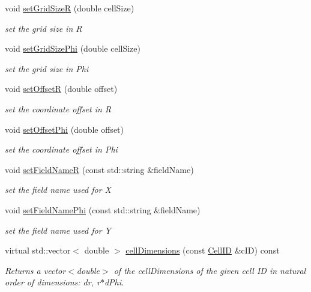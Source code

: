 \begin{DoxyCompactItemize}
void \hyperlink{class_d_d4hep_1_1_d_d_segmentation_1_1_polar_grid_r_phi_ab757b018648dc4207f94ab1d13d990ef}{set\+Grid\+SizeR} (double cell\+Size)
\begin{DoxyCompactList}\small\item\em set the grid size in R \end{DoxyCompactList}\item 
void \hyperlink{class_d_d4hep_1_1_d_d_segmentation_1_1_polar_grid_r_phi_af50d9792d10242bbc70cbd07709bc82b}{set\+Grid\+Size\+Phi} (double cell\+Size)
\begin{DoxyCompactList}\small\item\em set the grid size in Phi \end{DoxyCompactList}\item 
void \hyperlink{class_d_d4hep_1_1_d_d_segmentation_1_1_polar_grid_r_phi_ab3ee969820f45192085b4f8a51883dc4}{set\+OffsetR} (double offset)
\begin{DoxyCompactList}\small\item\em set the coordinate offset in R \end{DoxyCompactList}\item 
void \hyperlink{class_d_d4hep_1_1_d_d_segmentation_1_1_polar_grid_r_phi_a7724a483741721da3d8418623d75e351}{set\+Offset\+Phi} (double offset)
\begin{DoxyCompactList}\small\item\em set the coordinate offset in Phi \end{DoxyCompactList}\item 
void \hyperlink{class_d_d4hep_1_1_d_d_segmentation_1_1_polar_grid_r_phi_a8ea0d5863004fc7dc74a592ed631cd36}{set\+Field\+NameR} (const std\+::string \&field\+Name)
\begin{DoxyCompactList}\small\item\em set the field name used for X \end{DoxyCompactList}\item 
void \hyperlink{class_d_d4hep_1_1_d_d_segmentation_1_1_polar_grid_r_phi_ae7613ded8629daf8dc2d23160b7f3206}{set\+Field\+Name\+Phi} (const std\+::string \&field\+Name)
\begin{DoxyCompactList}\small\item\em set the field name used for Y \end{DoxyCompactList}\item 
virtual std\+::vector$<$ double $>$ \hyperlink{class_d_d4hep_1_1_d_d_segmentation_1_1_polar_grid_r_phi_a4d5962baf2ea8024e0b3c4f0b8d1185e}{cell\+Dimensions} (const \hyperlink{namespace_d_d4hep_1_1_d_d_segmentation_ac7af071d85cb48820914434a07e21ba1}{Cell\+ID} \&c\+ID) const
\begin{DoxyCompactList}\small\item\em Returns a vector$<$double$>$ of the cell\+Dimensions of the given cell ID in natural order of dimensions\+: dr, r$\ast$d\+Phi. \end{DoxyCompactList}\end{DoxyCompactItemize}
